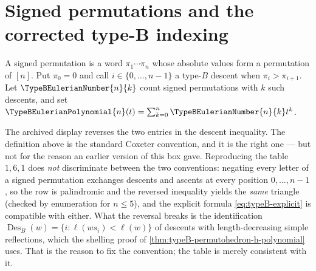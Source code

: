 \documentclass[11pt,a4paper,oneside,openany]{book}
\theoremstyle{definition}
\theoremstyle{remark}
\begin{document}
\section{Signed permutations and the corrected type-B indexing}
A signed permutation is a word $\pi_1\cdots\pi_n$ whose absolute values form a
permutation of $[n]$.  Put $\pi_0=0$ and call
$i\in\{0,\ldots,n-1\}$ a type-$B$ descent when $\pi_i>\pi_{i+1}$.
Let $\TypeBEulerianNumber{n}{k}$ count signed permutations with $k$ such descents, and set
$\TypeBEulerianPolynomial{n}(t)=\sum_{k=0}^{n}\TypeBEulerianNumber{n}{k}t^k$.

\begin{auditbox}
The archived display reverses the two entries in the descent inequality.  The
definition above is the standard Coxeter convention, and it is the right one ---
but not for the reason an earlier version of this box gave.  Reproducing the
table $1,6,1$ does \emph{not} discriminate between the two conventions: negating
every letter of a signed permutation exchanges descents and ascents at every
position $0,\ldots,n-1$, so the row is palindromic and the reversed inequality
yields the \emph{same} triangle (checked by enumeration for $n\le5$), and the
explicit formula \eqref{eq:typeB-explicit} is compatible with either.  What the
reversal breaks is the identification
$\operatorname{Des}_B(w)=\{i:\ell(ws_i)<\ell(w)\}$ of descents with
length-decreasing simple reflections, which the shelling proof of
\cref{thm:typeB-permutohedron-h-polynomial} uses.  That is the reason to fix the
convention; the table is merely consistent with it.
\end{auditbox}
\end{document}
